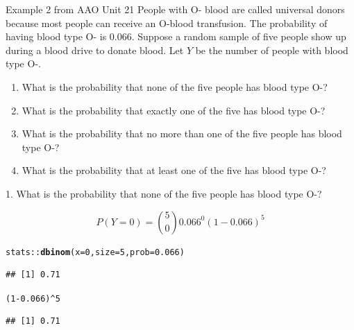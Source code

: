 \documentclass[10pt]{beamer}\usepackage[]{graphicx}\usepackage[]{color}
\makeatletter
\newcommand{\hlnum}[1]{\textcolor[rgb]{0.686,0.059,0.569}{#1}}%
\newcommand{\hlopt}[1]{\textcolor[rgb]{0,0,0}{#1}}%
\newcommand{\hlstd}[1]{\textcolor[rgb]{0.345,0.345,0.345}{#1}}%
\newcommand{\hlkwc}[1]{\textcolor[rgb]{0.333,0.667,0.333}{#1}}%
\newcommand{\hlkwd}[1]{\textcolor[rgb]{0.737,0.353,0.396}{\textbf{#1}}}%
\newenvironment{kframe}{%
 \def\at@end@of@kframe{}%
 \ifinner\ifhmode%
  \def\at@end@of@kframe{\end{minipage}}%
  \begin{minipage}{\columnwidth}%
 \fi\fi%
 \def\FrameCommand##1{\hskip\@totalleftmargin \hskip-\fboxsep
 \colorbox{shadecolor}{##1}\hskip-\fboxsep
     \hskip-\linewidth \hskip-\@totalleftmargin \hskip\columnwidth}%
 \MakeFramed {\advance\hsize-\width
   \@totalleftmargin\z@ \linewidth\hsize
   \@setminipage}}%
 {\par\unskip\endMakeFramed%
 \at@end@of@kframe}
\newenvironment{knitrout}{}{} %
\makeatother
\begin{document}
\begin{frame}{Example 2 from AAO Unit 21}
	People with O- blood are called universal donors because most people can receive an O-blood transfusion. The probability of having blood type O- is 0.066. Suppose a random sample of five people show up during a blood drive to donate blood. Let $Y$ be the number of people with blood type O-.
	
	\begin{enumerate}
		\item What is the probability that none of the five people has blood type O-?
		\item What is the probability that exactly one of the five has blood type O-?
		\item What is the probability that no more than one of the five people has blood type O-?
		\item What is the probability that at least one of the five has blood type O-?
	\end{enumerate}
\end{frame}


\begin{frame}[fragile]{1. What is the probability that none of the five people has blood type O-?}
	
	$$ 
	P(Y = 0) = \binom{5}{0} 0.066^0 (1- 0.066)^5
	$$
	
	
\begin{knitrout}\tiny
{}\color{fgcolor}\begin{kframe}
\begin{alltt}
\hlstd{stats}\hlopt{::}\hlkwd{dbinom}\hlstd{(}\hlkwc{x} \hlstd{=} \hlnum{0}\hlstd{,} \hlkwc{size} \hlstd{=} \hlnum{5}\hlstd{,} \hlkwc{prob} \hlstd{=} \hlnum{0.066}\hlstd{)}
\end{alltt}
\begin{verbatim}
## [1] 0.71
\end{verbatim}
\begin{alltt}
\hlstd{(}\hlnum{1}\hlopt{-}\hlnum{0.066}\hlstd{)}\hlopt{^}\hlnum{5}
\end{alltt}
\begin{verbatim}
## [1] 0.71
\end{verbatim}
\end{kframe}
\end{knitrout}
	
\end{frame}
\end{document}

